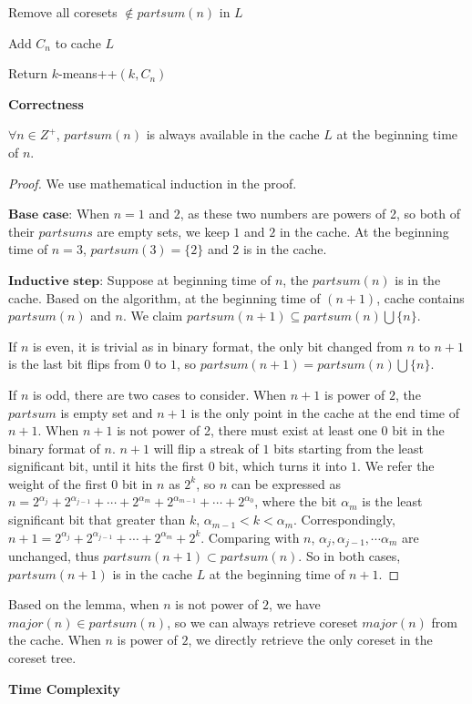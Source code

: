 {{\begin{algorithm}
Remove all coresets $\notin partsum(n)$ in $L$\;

Add $C_n$ to cache $L$\;

Return $k$-means++$(k, C_n)$\;
\end{algorithm}

\textbf{Correctness}

\begin{lemma}
$\forall n\in Z^+$, $partsum(n)$ is always available in the cache $L$ at the beginning time of $n$.
\begin{proof}
We use mathematical induction in the proof.

$\textbf{Base case:}$ 
When $n=1$ and $2$, as these two numbers are powers of 2, so both of their $partsums$ are empty sets, we keep $1$ and $2$ in the cache.
At the beginning time of $n=3$, $partsum(3)=\{2\}$ and $2$ is in the cache.

$\textbf{Inductive step:}$
Suppose at beginning time of $n$, the $partsum(n)$ is in the cache. Based on the algorithm, at the beginning time of $(n+1)$, cache contains $partsum(n)$ and $n$. We claim $partsum(n+1) \subseteq partsum(n)\bigcup \{n\}$.

If $n$ is even, it is trivial as in binary format, the only bit changed from $n$ to $n+1$ is the last bit flips from $0$ to $1$, so $partsum(n+1) = partsum(n)\bigcup \{n\}$.

If $n$ is odd, there are two cases to consider.
When $n+1$ is power of $2$, the $partsum$ is empty set and $n+1$ is the only point in the cache at the end time of $n+1$. 
When $n+1$ is not power of 2, there must exist at least one $0$ bit in the binary format of $n$. $n+1$ will flip a streak of $1$ bits starting from the least significant bit, until it hits the first $0$ bit, which turns it into $1$. We refer the weight of the first $0$ bit in $n$ as $2^k$, so $n$ can be expressed as $n = 2^{\alpha_j}+2^{\alpha_{j-1}}+ \cdots + 2^{\alpha_m} + 2^{\alpha_{m-1}} + \cdots + 2^{\alpha_0}$, where the bit $\alpha_m$ is the least significant bit that greater than $k$, $\alpha_{m-1} < k < \alpha_{m}$. Correspondingly, $n+1 = 2^{\alpha_j}+2^{\alpha_{j-1}}+ \cdots + 2^{\alpha_m} + 2^k$. Comparing with $n$, $\alpha_j, \alpha_{j-1}, \cdots \alpha_m$ are unchanged, thus $partsum(n+1) \subset partsum(n)$. So in both cases, $partsum(n+1)$ is in the cache $L$ at the beginning time of $n+1$.
\end{proof}
\end{lemma}
Based on the lemma, when $n$ is not power of $2$, we have $major(n) \in partsum(n)$, so we can always retrieve coreset $major(n)$ from the cache. When $n$ is power of $2$, we directly retrieve the only coreset in the coreset tree. 


\textbf{Time Complexity}
}
}
